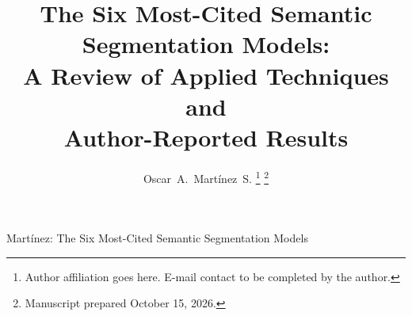 \documentclass[journal]{IEEEtran}
\begin{document}
%
\title{The Six Most-Cited Semantic Segmentation Models:\\ A Review of Applied Techniques and\\ Author-Reported Results}
%
%
%

\author{Oscar~A.~Mart\'{i}nez~S.%
\thanks{Author affiliation goes here. E-mail contact to be completed by the author.}%
\thanks{Manuscript prepared October 15, 2026.}}

%
%



%
{Mart\'{i}nez: The Six Most-Cited Semantic Segmentation Models}
%
\end{document}
